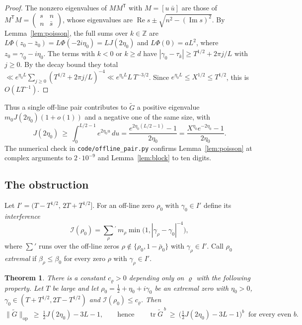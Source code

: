 \documentclass[reqno,11pt]{amsart}
\numberwithin{equation}{section}
\theoremstyle{plain}
\newtheorem{theorem}{Theorem}[section]
\theoremstyle{remark}
\DeclareMathOperator{\tr}{tr}
\DeclareMathOperator{\Real}{Re}
\DeclareMathOperator{\Imag}{Im}
\begin{document}
\begin{proof}
The nonzero eigenvalues of $MM^{\mathsf T}$ with $M=[u\ \bar u]$ are those of
$M^{\mathsf T}M=\begin{pmatrix}s&n\\ n&\bar s\end{pmatrix}$, whose eigenvalues
are $\Real s\pm\sqrt{n^2-(\Imag s)^2}$. By Lemma~\ref{lem:poisson}, the full
sums over $k\in\mathbb Z$ are $L\Phi(z_0-\bar z_0)=L\Phi(-2i\eta_0)=LJ(2\eta_0)$
and $L\Phi(0)=aL^2$, where $z_0=\gamma_0-i\eta_0$. The terms with $k<0$ or
$k\ge d$ have $|\gamma_0-\tau_k|\ge T^{1/2}+2\pi j/L$ with $j\ge0$. By the decay
bound they total $\ll e^{\eta_0L}\sum_{j\ge0}(T^{1/2}+2\pi j/L)^{-4}\ll e^{\eta_0L}L\,T^{-3/2}$.
Since $e^{\eta_0 L}\le X^{1/2}\le T^{1/2}$, this is $O(LT^{-1})$.
\end{proof}

Thus a single off-line pair contributes to $\widetilde G$ a positive eigenvalue
$m_0J(2\eta_0)(1+o(1))$ and a negative one of the same size, with
\begin{equation}\label{eq:Jlower}
J(2\eta_0)\ \ge\ \int_0^{L/2-1}e^{2\eta_0u}\,du
=\frac{e^{2\eta_0(L/2-1)}-1}{2\eta_0}=\frac{X^{\eta_0}e^{-2\eta_0}-1}{2\eta_0}.
\end{equation}
The numerical check in \texttt{code/offline\_pair.py} confirms
Lemma~\ref{lem:poisson} at complex arguments to $2\cdot10^{-9}$ and
Lemma~\ref{lem:block} to ten digits.

\subsection{The obstruction}
Let $I'=(T-T^{1/2},\,2T+T^{1/2}]$. For an off-line zero $\rho_0$ with
$\gamma_0\in I'$ define its \emph{interference}
\[
\mathcal I(\rho_0)=\sum_{\rho}{}^{'}\,m_\rho\min\bigl(1,|\gamma_\rho-\gamma_0|^{-4}\bigr),
\]
where $\sum'$ runs over the off-line zeros $\rho\notin\{\rho_0,1-\bar\rho_0\}$
with $\gamma_\rho\in I'$. Call $\rho_0$ \emph{extremal} if
$\beta_\rho\le\beta_0$ for every zero $\rho$ with $\gamma_\rho\in I'$.

\begin{theorem}\label{thm:obstruction}
There is a constant $c_\varrho>0$ depending only on $\varrho$ with the
following property. Let $T$ be large and let $\rho_0=\frac12+\eta_0+i\gamma_0$
be an extremal zero with $\eta_0>0$,
$\gamma_0\in(T+T^{1/2},2T-T^{1/2})$ and $\mathcal I(\rho_0)\le c_\varrho$. Then
\[
\|\widetilde G\|_{\mathrm{op}}\ \ge\ \tfrac12J(2\eta_0)-3L-1,
\qquad\text{hence}\qquad
\tr\widetilde G^{\,b}\ \ge\ \bigl(\tfrac12J(2\eta_0)-3L-1\bigr)^{b}
\ \text{ for every even } b.
\]
\end{theorem}
\end{document}
